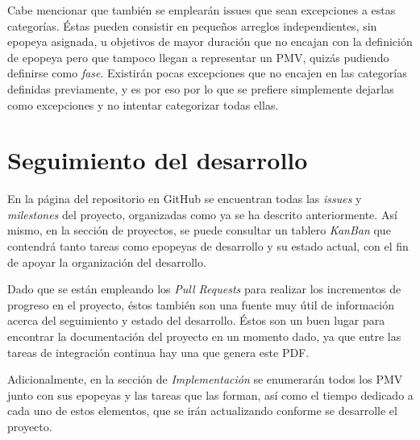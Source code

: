 Cabe mencionar que también se emplearán issues que sean excepciones a estas categorías. Éstas pueden consistir en pequeños arreglos independientes, sin epopeya asignada, u objetivos de mayor duración que no encajan con la definición de epopeya pero que tampoco llegan a representar un PMV, quizás pudiendo definirse como \textit{fase}. Existirán pocas excepciones que no encajen en las categorías definidas previamente, y es por eso por lo que se prefiere simplemente dejarlas como excepciones y no intentar categorizar todas ellas.

\section{Seguimiento del desarrollo}

En la página del repositorio en GitHub se encuentran todas las \textit{issues} y \textit{milestones} del proyecto, organizadas como ya se ha descrito anteriormente. Así mismo, en la sección de proyectos, se puede consultar un tablero \textit{KanBan} que contendrá tanto tareas como epopeyas de desarrollo y su estado actual, con el fin de apoyar la organización del desarrollo.

Dado que se están empleando los \textit{Pull Requests} para realizar los incrementos de progreso en el proyecto, éstos también son una fuente muy útil de información acerca del seguimiento y estado del desarrollo. Éstos son un buen lugar para encontrar la documentación del proyecto en un momento dado, ya que entre las tareas de integración continua hay una que genera este PDF.

Adicionalmente, en la sección de \textit{Implementación} se enumerarán todos los PMV junto con sus epopeyas y las tareas que las forman, así como el tiempo dedicado a cada uno de estos elementos, que se irán actualizando conforme se desarrolle el proyecto.